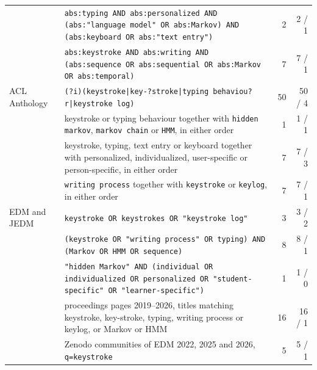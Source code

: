 \documentclass[10pt]{article}
\begin{document}
\begin{small}
\begin{longtable}{>{\raggedright}p{2.3cm}>{\raggedright}p{8.6cm}rr}
 & \texttt{abs:typing AND abs:personalized AND (abs:"language model" OR abs:Markov) AND (abs:keyboard OR abs:"text entry")} & 2 & 2 / 1 \\
 & \texttt{abs:keystroke AND abs:writing AND (abs:sequence OR abs:sequential OR abs:Markov OR abs:temporal)} & 7 & 7 / 1 \\
ACL Anthology\footnotemark[3] & \texttt{(?i)(keystroke|key-?stroke|typing behaviou?r|keystroke log)} & 50 & 50 / 4 \\
 & keystroke or typing behaviour together with \texttt{hidden markov}, \texttt{markov chain} or \texttt{HMM}, in either order & 1 & 1 / 1 \\
 & keystroke, typing, text entry or keyboard together with personalized, individualized, user-specific or person-specific, in either order & 7 & 7 / 3 \\
 & \texttt{writing process} together with \texttt{keystroke} or \texttt{keylog}, in either order & 7 & 7 / 1 \\
EDM and JEDM\footnotemark[4] & \texttt{keystroke OR keystrokes OR "keystroke log"} & 3 & 3 / 2 \\
 & \texttt{(keystroke OR "writing process" OR typing) AND (Markov OR HMM OR sequence)} & 8 & 8 / 1 \\
 & \texttt{"hidden Markov" AND (individual OR individualized OR personalized OR "student-specific" OR "learner-specific")} & 1 & 1 / 0 \\
 & proceedings pages 2019--2026, titles matching keystroke, key-stroke, typing, writing process or keylog, or Markov or HMM & 16 & 16 / 1 \\
 & Zenodo communities of EDM 2022, 2025 and 2026, \texttt{q=keystroke} & 5 & 5 / 1 \\
\bottomrule
\end{longtable}
\end{small}
\noindent{}
\end{document}
